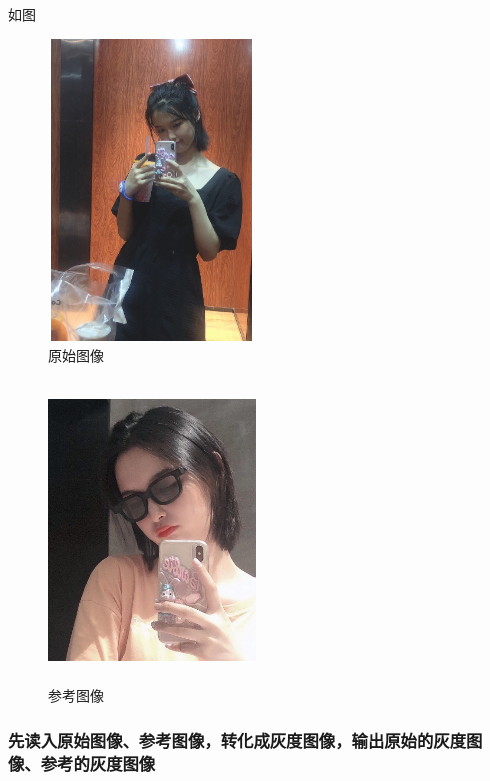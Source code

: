 \documentclass{article}
\begin{document}
  如图
                \begin{figure}[h!]
                \centering
                \includegraphics[width=5.5cm,height=8cm]{xuan9.png}
                \caption{原始图像}
                \end{figure}
                \begin{figure}[h!]
                \centering
                \includegraphics[width=5.5cm,height=8cm]{xuan8.png}
                \caption{参考图像}
                \end{figure}

  \subsubsection{先读入原始图像、参考图像，转化成灰度图像，输出原始的灰度图像、参考的灰度图像}
\end{document}
